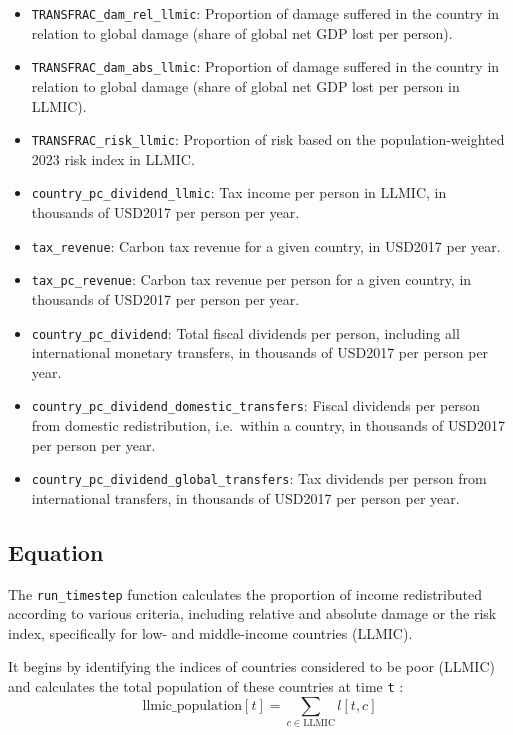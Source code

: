 \documentclass[
]{article}
\providecommand{\tightlist}{%
  \setlength{\itemsep}{0pt}\setlength{\parskip}{0pt}}
\begin{document}
\begin{itemize}
\tightlist
\item
  \texttt{TRANSFRAC\_dam\_rel\_llmic}: Proportion of damage suffered in
  the country in relation to global damage (share of global net GDP lost
  per person).
\item
  \texttt{TRANSFRAC\_dam\_abs\_llmic}: Proportion of damage suffered in
  the country in relation to global damage (share of global net GDP lost
  per person in LLMIC).
\item
  \texttt{TRANSFRAC\_risk\_llmic}: Proportion of risk based on the
  population-weighted 2023 risk index in LLMIC.
\item
  \texttt{country\_pc\_dividend\_llmic}: Tax income per person in LLMIC, in thousands of USD2017 per person per year.
\item
  \texttt{tax\_revenue}: Carbon tax revenue for a given country, in USD2017 per year.
\item
  \texttt{tax\_pc\_revenue}: Carbon tax revenue per person for a given
  country, in thousands of USD2017 per person per year.
\item
  \texttt{country\_pc\_dividend}: Total fiscal dividends per person,
  including all international monetary transfers, in thousands of
  USD2017 per person per year.
\item
  \texttt{country\_pc\_dividend\_domestic\_transfers}: Fiscal dividends
  per person from domestic redistribution, i.e.~within a country, in
  thousands of USD2017 per person per year.
\item
  \texttt{country\_pc\_dividend\_global\_transfers}: Tax dividends per
  person from international transfers, in thousands of USD2017 per
  person per year.
\end{itemize}

\subsection{Equation}\label{equation-2}

The \texttt{run\_timestep} function calculates the proportion of income
redistributed according to various criteria, including relative and
absolute damage or the risk index, specifically for low- and
middle-income countries (LLMIC).

It begins by identifying the indices of countries considered to be poor
(LLMIC) and calculates the total population of these countries at time
\texttt{t} :
\begin{equation}
\text{llmic\_population}[t] = \sum_{c \in \text{LLMIC}}l[t, c]
\end{equation}
\end{document}

